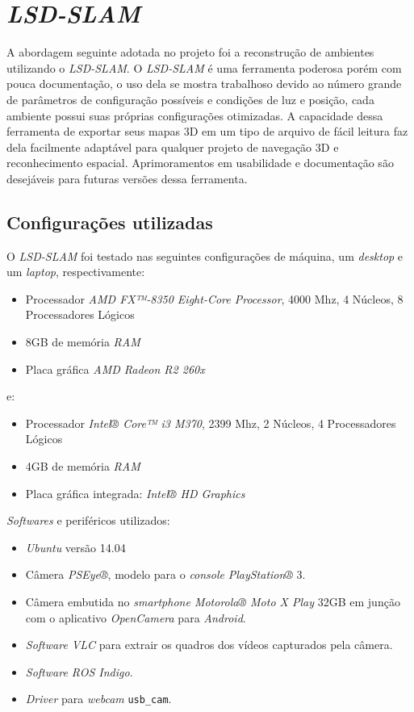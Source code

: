 \section{\textit{LSD-SLAM}}

A abordagem seguinte adotada no projeto foi a reconstrução de ambientes utilizando o \textit{LSD-SLAM}. O \textit{LSD-SLAM} é uma ferramenta poderosa porém com pouca documentação, o uso dela se mostra trabalhoso devido ao número grande de parâmetros de configuração possíveis e condições de luz e posição, cada ambiente possui suas próprias configurações otimizadas. A capacidade dessa ferramenta de exportar seus mapas 3D em um tipo de arquivo de fácil leitura faz dela facilmente adaptável para qualquer projeto de navegação 3D e reconhecimento espacial. Aprimoramentos em usabilidade e documentação são desejáveis para futuras versões dessa ferramenta. 

\subsection{Configurações utilizadas}

O \textit{LSD-SLAM} foi testado nas seguintes configurações de máquina, um \textit{desktop} e um \textit{laptop}, respectivamente:

\begin{itemize}
	\item{Processador	\textit{AMD FX™-8350 Eight-Core Processor}, 4000 Mhz, 4 Núcleos, 8 Processadores Lógicos}
	\item{8GB de memória \textit{RAM}}
	\item{Placa gráfica \textit{AMD Radeon R2 260x}}
\end{itemize}

e:

\begin{itemize}
	\item{Processador \textit{Intel® Core™ i3 M370}, 2399 Mhz, 2 Núcleos, 4 Processadores Lógicos}
	\item{4GB de memória \textit{RAM}}
	\item{Placa gráfica integrada: \textit{Intel® HD Graphics}}
\end{itemize}	

\textit{Softwares} e periféricos utilizados:

\begin{itemize}
	\item{\textit{Ubuntu} versão 14.04\cite{Ubuntu}}
	\item{Câmera \textit{PSEye®}, modelo para o \textit{console} \textit{PlayStation®} 3.}
	\item{Câmera embutida no \textit{smartphone Motorola® Moto X Play} 32GB em junção com o aplicativo \textit{OpenCamera} para \textit{Android}.}
	\item{\textit{Software VLC} para extrair os quadros dos vídeos capturados pela câmera.}
	\item{\textit{Software ROS Indigo}.\cite{ROS-Tutorial}}
	\item{\textit{Driver} para \textit{webcam} \texttt{usb\_cam}.\cite{Setup-USBCAM}}
\end{itemize}

